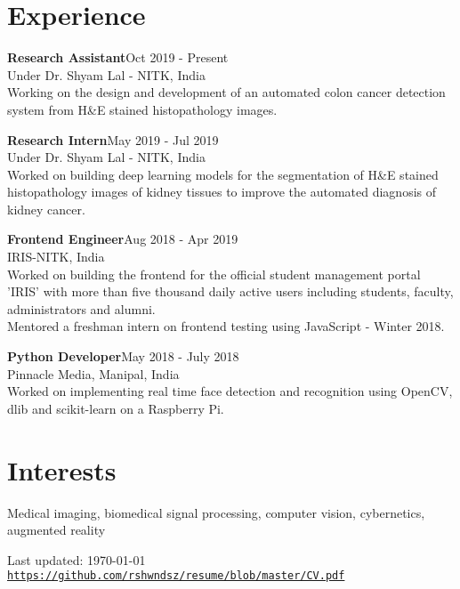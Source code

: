 \documentclass[letterpaper]{article}
\def\footerlink{https://github.com/rshwndsz/resume/blob/master/CV.pdf}
\renewenvironment{itemize}{
  \begin{list}{}{
    \setlength{\leftmargin}{1.5em}
  }
}{
  \end{list}
}
\begin{document}
\section*{Experience}
  \begin{itemize}
    \item \textbf{Research Assistant}\hfill{\textcolor{black!80}{\small{Oct 2019 - Present}}}\\
    \textcolor{black!80}{\small{Under Dr. Shyam Lal - NITK, India}}\\
    Working on the design and development of an automated colon cancer detection system from H\&E stained histopathology images.

    \item \textbf{Research Intern}\hfill{\textcolor{black!80}{\small{May 2019 - Jul 2019}}}\\
    \textcolor{black!80}{\small{Under Dr. Shyam Lal - NITK, India}}\\
    Worked on building deep learning models for the segmentation of H\&E stained histopathology images of kidney tissues to improve the automated diagnosis of kidney cancer.

    \item \textbf{Frontend Engineer}\hfill{\textcolor{black!80}{\small{Aug 2018 - Apr 2019}}}\\
    \textcolor{black!80}{\small{IRIS-NITK, India}}\\
    Worked on building the frontend for the official student management portal 'IRIS' with more than five thousand daily active users including students, faculty, administrators and alumni.\\
    Mentored a freshman intern on frontend testing using JavaScript - Winter 2018.

    \item \textbf{Python Developer}\hfill{\textcolor{black!80}{\small{May 2018 - July 2018}}}\\
    \textcolor{black!80}{\small{Pinnacle Media, Manipal, India}}\\
    Worked on implementing real time face detection and recognition using OpenCV, dlib and scikit-learn on a Raspberry Pi.
  \end{itemize}


\section*{Interests}
  \begin{itemize}
    \item Medical imaging, biomedical signal processing, computer vision, cybernetics, augmented reality
  \end{itemize}


\bigskip
\begin{center}
  \begin{footnotesize}
    Last updated: \today \\
    \href{\footerlink}{\texttt{\footerlink}}
  \end{footnotesize}
\end{center}
\end{document}
